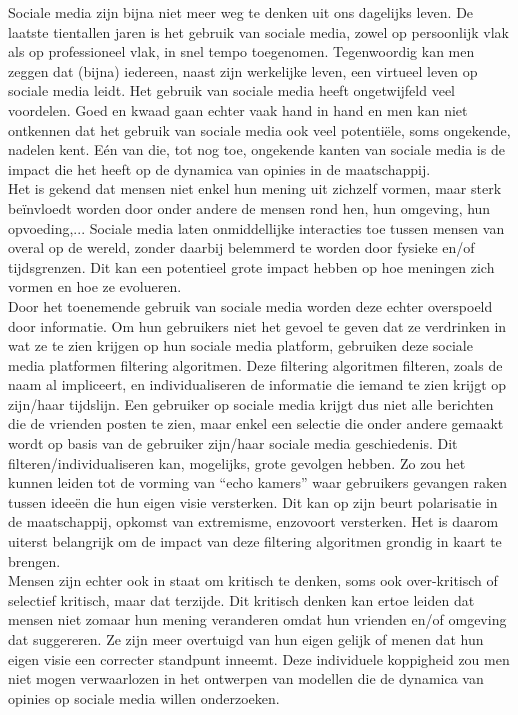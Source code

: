 \documentclass[11 pt , letterpaper , twoside , openright]{book}
\newenvironment{abstract}%
{\cleardoublepage\null \vfill\begin{center}\bfseries \abstractname \end{center}}{\vfill\null}
\begin{document}
\begin{abstract}
\noindent
Sociale media zijn bijna niet meer weg te denken uit ons dagelijks leven. De laatste tientallen jaren is het gebruik van sociale media, zowel op persoonlijk vlak als op professioneel vlak, in snel tempo toegenomen. Tegenwoordig kan men zeggen dat (bijna) iedereen, naast zijn werkelijke leven, een virtueel leven op sociale media leidt. Het gebruik van sociale media heeft ongetwijfeld veel voordelen. Goed en kwaad gaan echter vaak hand in hand en men kan niet ontkennen dat het gebruik van sociale media ook veel potentiële, soms ongekende, nadelen kent. Eén van die, tot nog toe, ongekende kanten van sociale media is de impact die het heeft op de dynamica van opinies in de maatschappij. \\
\newline
Het is gekend dat mensen niet enkel hun mening uit zichzelf vormen, maar sterk beïnvloedt worden door onder andere de mensen rond hen, hun omgeving, hun opvoeding,... Sociale media laten onmiddellijke interacties toe tussen mensen van overal op de wereld, zonder daarbij belemmerd te worden door fysieke en/of tijdsgrenzen. Dit kan een potentieel grote impact hebben op hoe meningen zich vormen en hoe ze evolueren.\\
\newline
Door het toenemende gebruik van sociale media worden deze echter overspoeld door informatie. Om hun gebruikers niet het gevoel te geven dat ze verdrinken in wat ze te zien krijgen op hun sociale media platform, gebruiken deze sociale media platformen  filtering algoritmen. Deze filtering algoritmen filteren, zoals de naam al impliceert, en individualiseren de informatie die iemand te zien krijgt op zijn/haar tijdslijn. Een gebruiker op sociale media krijgt dus niet alle berichten die de vrienden posten te zien, maar enkel een selectie die onder andere gemaakt wordt op basis van de gebruiker zijn/haar sociale media geschiedenis. Dit filteren/individualiseren kan, mogelijks, grote gevolgen hebben. Zo zou het kunnen leiden tot de vorming van  ``echo kamers'' waar gebruikers gevangen raken tussen ideeën die hun eigen visie versterken. Dit kan op zijn beurt polarisatie in de maatschappij, opkomst van extremisme, enzovoort versterken. Het is daarom uiterst belangrijk om de impact van deze filtering algoritmen grondig in kaart te brengen.\\
\newline
Mensen zijn echter ook in staat om kritisch te denken, soms ook over-kritisch of selectief kritisch, maar dat terzijde. Dit kritisch denken kan ertoe leiden dat mensen niet zomaar hun mening veranderen omdat hun vrienden en/of omgeving dat suggereren. Ze zijn meer overtuigd van hun eigen gelijk of menen dat hun eigen visie een correcter standpunt inneemt. Deze individuele koppigheid zou men niet mogen verwaarlozen in het ontwerpen van modellen die de dynamica van opinies op sociale media willen onderzoeken.\\

\end{abstract}
\end{document}
